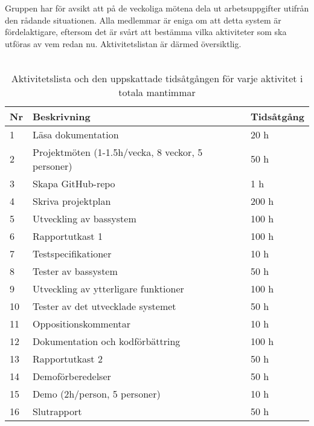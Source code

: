 \documentclass[a4paper]{article}
\begin{document}
Gruppen har för avsikt att på de veckoliga mötena dela ut arbetsuppgifter utifrån den rådande situationen. Alla medlemmar är eniga om att detta system är fördelaktigare, eftersom det är svårt att bestämma vilka aktiviteter som ska utföras av vem redan nu. Aktivitetslistan är därmed översiktlig.
\\
\\
\begin{table}[t]
\begin{tabular}{| l | l | l |}
\hline
Nr & Beskrivning & Tidsåtgång \\ \hline
1 & Läsa dokumentation & 20 h \\ \hline
2 & Projektmöten (1-1.5h/vecka, 8 veckor, 5 personer) & 50 h \\ \hline
3 & Skapa GitHub-repo & 1 h \\ \hline
4 & Skriva projektplan & 200 h \\ \hline
5 & Utveckling av bassystem & 100 h \\ \hline
6 & Rapportutkast 1 & 100 h \\ \hline
7 & Testspecifikationer & 10 h \\ \hline
8 & Tester av bassystem & 50 h \\ \hline
9 & Utveckling av ytterligare funktioner & 100 h \\ \hline
10 & Tester av det utvecklade systemet & 50 h \\ \hline
11 & Oppositionskommentar & 10 h \\ \hline
12 & Dokumentation och kodförbättring & 100 h \\ \hline
13 & Rapportutkast 2 & 50 h \\ \hline
14 & Demoförberedelser & 50 h \\ \hline
15 & Demo (2h/person, 5 personer) & 10 h \\ \hline
16 & Slutrapport & 50 h \\ \hline
\end{tabular}
\caption{Aktivitetslista och den uppskattade tidsåtgången för varje aktivitet i totala mantimmar}
\end{table}
\end{document}
